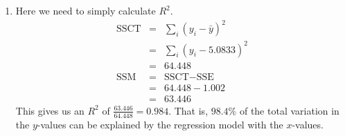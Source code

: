 {\begin{enumerate}
      With this in mind, we get the (estimated) variance value needed for the prediction interval by taking $s_{\hat{Y}}^2$ and adding our estimate of $\sigma^2$ to it:
      \begin{eqnarray*}
        s_{pred}^2 &=& \hat{\sigma}^2 + s_{\hat{Y}}^2\\
        &=& \frac{1}{n - 2} \text{SSE} + 0.042\\
        &=& 0.251 + 0.042\\
        &=& 0.293\\
      \end{eqnarray*}
      Now we can make the prediction interval similarly to how we made the confidence interval in (e):
      \begin{eqnarray*}
        \hat{Y}_{new} \pm t_{4, 0.975} \sqrt{s^2_{pred}} &=& \hat{\beta}_0 + \hat{\beta}_1(5) \pm (2.776) \sqrt{0.293}\\
        &=& -0.169 + 5(1.0504) \pm 2.776(0.541)\\
        &=& (3.581, 6.585)
      \end{eqnarray*}
    \item Here we need to simply calculate $R^2$.
      \begin{eqnarray*}
        \text{SSCT} &=& \sum_i (y_i - \bar{y})^2\\
        &=& \sum_i (y_i - 5.0833)^2\\
        &=& 64.448\\
        \text{SSM} &=& \text{SSCT} - \text{SSE}\\
        &=& 64.448 - 1.002\\
        &=& 63.446
      \end{eqnarray*}
      This gives us an $R^2$ of $\frac{63.446}{64.448} = 0.984$. That is, $98.4\%$ of the total variation in the $y$-values can be explained by the regression model with the $x$-values.
  \end{enumerate}
}